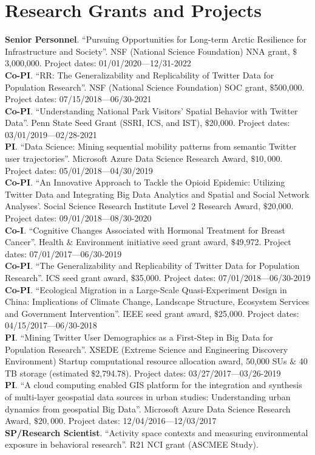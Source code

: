 \documentclass[11pt, a4paper]{article}
\begin{document}
\section*{Research Grants and Projects}
\textbf{Senior Personnel}. ``Pursuing Opportunities for Long-term Arctic Resilience for Infrastructure and Society''. NSF (National Science Foundation) NNA grant, $\$$3,000,000. Project dates: 01/01/2020—12/31-2022\\
\textbf{Co-PI}. ``RR: The Generalizability and Replicability of Twitter Data for Population Research''. NSF (National Science Foundation) SOC grant, $\$$500,000. Project dates: 07/15/2018—06/30-2021\\
\textbf{Co-PI}. ``Understanding National Park Visitors’ Spatial Behavior with Twitter Data''. Penn State Seed Grant (SSRI, ICS, and IST), $\$$20,000. Project dates: 03/01/2019—02/28-2021\\
\textbf{PI}. ``Data Science: Mining sequential mobility patterns from semantic Twitter user trajectories''. Microsoft Azure Data Science Research Award, $\$10,000$. Project dates: 05/01/2018—04/30/2019\\
\textbf{Co-PI}. ``An Innovative Approach to Tackle the Opioid Epidemic: Utilizing Twitter Data and Integrating Big Data Analytics and Spatial and Social Network Analyses'. Social Science Research Institute Level 2 Research Award, $\$$20,000. Project dates: 09/01/2018—08/30-2020\\
\textbf{Co-I}. ``Cognitive Changes Associated with Hormonal Treatment for Breast Cancer''. Health $\&$ Environment initiative seed grant award, $\$$49,972. Project dates: 07/01/2017—06/30-2019\\
\textbf{Co-PI}. ``The Generalizability and Replicability of Twitter Data for Population Research''. ICS seed grant award, $\$$35,000. Project dates: 07/01/2018—06/30-2019\\
\textbf{Co-PI}. ``Ecological Migration in a Large-Scale Quasi-Experiment Design in China: Implications of Climate Change, Landscape Structure, Ecosystem Services and Government Intervention''. IEEE seed grant award, $\$$25,000. Project dates: 04/15/2017—06/30-2018\\
\textbf{PI}. ``Mining Twitter User Demographics as a First-Step in Big Data for Population Research''. XSEDE (Extreme Science and Engineering Discovery Environment) Startup computational resource allocation award, 50,000 SUs $\&$ 40 TB storage (estimated $\$$2,794.78). Project dates: 03/27/2017—03/26-2019\\
\textbf{PI}. ``A cloud computing enabled GIS platform for the integration and synthesis of multi-layer geospatial data sources in urban studies: Understanding urban dynamics from geospatial Big Data''. Microsoft Azure Data Science Research Award, $\$20,000$. Project dates: 12/04/2016—12/03/2017\\
\textbf{SP/Research Scientist}. ``Activity space contexts and measuring environmental exposure in behavioral research''. R21 NCI grant (ASCMEE Study).
\end{document}
